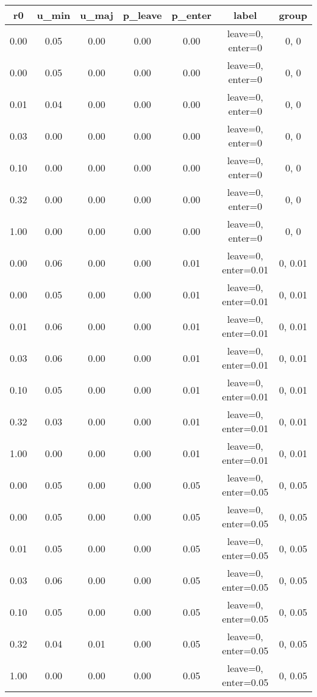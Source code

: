 \begin{table}[ht]
\centering
\begin{table}[ht]
\centering
\begin{tabular}{|ccccccc}
  \hline
r0 & u_min & u_maj & p_leave & p_enter & label & group \\ 
  \hline
0.00 & 0.05 & 0.00 & 0.00 & 0.00 & leave=0, enter=0 & 0, 0 \\ 
  0.00 & 0.05 & 0.00 & 0.00 & 0.00 & leave=0, enter=0 & 0, 0 \\ 
  0.01 & 0.04 & 0.00 & 0.00 & 0.00 & leave=0, enter=0 & 0, 0 \\ 
  0.03 & 0.00 & 0.00 & 0.00 & 0.00 & leave=0, enter=0 & 0, 0 \\ 
  0.10 & 0.00 & 0.00 & 0.00 & 0.00 & leave=0, enter=0 & 0, 0 \\ 
  0.32 & 0.00 & 0.00 & 0.00 & 0.00 & leave=0, enter=0 & 0, 0 \\ 
  1.00 & 0.00 & 0.00 & 0.00 & 0.00 & leave=0, enter=0 & 0, 0 \\ 
  0.00 & 0.06 & 0.00 & 0.00 & 0.01 & leave=0, enter=0.01 & 0, 0.01 \\ 
  0.00 & 0.05 & 0.00 & 0.00 & 0.01 & leave=0, enter=0.01 & 0, 0.01 \\ 
  0.01 & 0.06 & 0.00 & 0.00 & 0.01 & leave=0, enter=0.01 & 0, 0.01 \\ 
  0.03 & 0.06 & 0.00 & 0.00 & 0.01 & leave=0, enter=0.01 & 0, 0.01 \\ 
  0.10 & 0.05 & 0.00 & 0.00 & 0.01 & leave=0, enter=0.01 & 0, 0.01 \\ 
  0.32 & 0.03 & 0.00 & 0.00 & 0.01 & leave=0, enter=0.01 & 0, 0.01 \\ 
  1.00 & 0.00 & 0.00 & 0.00 & 0.01 & leave=0, enter=0.01 & 0, 0.01 \\ 
  0.00 & 0.05 & 0.00 & 0.00 & 0.05 & leave=0, enter=0.05 & 0, 0.05 \\ 
  0.00 & 0.05 & 0.00 & 0.00 & 0.05 & leave=0, enter=0.05 & 0, 0.05 \\ 
  0.01 & 0.05 & 0.00 & 0.00 & 0.05 & leave=0, enter=0.05 & 0, 0.05 \\ 
  0.03 & 0.06 & 0.00 & 0.00 & 0.05 & leave=0, enter=0.05 & 0, 0.05 \\ 
  0.10 & 0.05 & 0.00 & 0.00 & 0.05 & leave=0, enter=0.05 & 0, 0.05 \\ 
  0.32 & 0.04 & 0.01 & 0.00 & 0.05 & leave=0, enter=0.05 & 0, 0.05 \\ 
  1.00 & 0.00 & 0.00 & 0.00 & 0.05 & leave=0, enter=0.05 & 0, 0.05 \\ 

\end{tabular}
\end{table}
\end{table}
